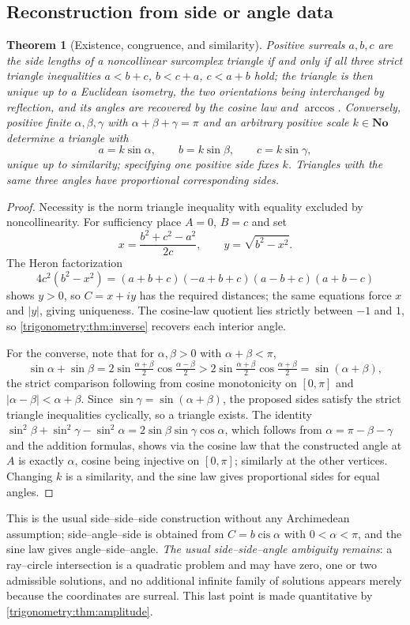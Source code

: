 \documentclass[11pt,letterpaper]{article}
\numberwithin{equation}{section}
\newtheorem{theorem}{Theorem}[section]
\theoremstyle{definition}
\theoremstyle{remark}
\newcommand{\No}{\mathbf{No}}
\newcommand{\cis}{\operatorname{cis}}
\begin{document}
\subsection{Reconstruction from side or angle data}
\begin{theorem}[Existence, congruence, and similarity]\label{trigonometry:thm:sss}
Positive surreals $a,b,c$ are the side lengths of a noncollinear surcomplex triangle if and only if
all three strict triangle inequalities $a<b+c$, $b<c+a$, $c<a+b$ hold; the triangle is then unique
up to a Euclidean isometry, the two orientations being interchanged by reflection, and its angles
are recovered by the cosine law and $\arccos$. Conversely, positive finite $\alpha,\beta,\gamma$
with $\alpha+\beta+\gamma=\pi$ and an arbitrary positive scale $k\in\No$ determine a triangle with
\[
 a=k\sin\alpha,\qquad b=k\sin\beta,\qquad c=k\sin\gamma,
\]
unique up to similarity; specifying one positive side fixes $k$. Triangles with the same three
angles have proportional corresponding sides.
\end{theorem}
\begin{proof}
Necessity is the norm triangle inequality with equality excluded by noncollinearity. For
sufficiency place $A=0$, $B=c$ and set
\[
 x=\frac{b^2+c^2-a^2}{2c},\qquad y=\sqrt{b^2-x^2} .
\]
The Heron factorization
\begin{equation}\label{trigonometry:eq:heronfactor}
 4c^2(b^2-x^2)=(a+b+c)(-a+b+c)(a-b+c)(a+b-c)
\end{equation}
shows $y>0$, so $C=x+iy$ has the required distances; the same equations force $x$ and $|y|$, giving
uniqueness. The cosine-law quotient lies strictly between $-1$ and $1$, so
\cref{trigonometry:thm:inverse} recovers each interior angle.

For the converse, note that for $\alpha,\beta>0$ with $\alpha+\beta<\pi$,
\[
 \sin\alpha+\sin\beta=2\sin\tfrac{\alpha+\beta}2\cos\tfrac{\alpha-\beta}2
 >2\sin\tfrac{\alpha+\beta}2\cos\tfrac{\alpha+\beta}2=\sin(\alpha+\beta),
\]
the strict comparison following from cosine monotonicity on $[0,\pi]$ and
$|\alpha-\beta|<\alpha+\beta$. Since $\sin\gamma=\sin(\alpha+\beta)$, the proposed sides satisfy
the strict triangle inequalities cyclically, so a triangle exists. The identity
$\sin^2\beta+\sin^2\gamma-\sin^2\alpha=2\sin\beta\sin\gamma\cos\alpha$, which follows from
$\alpha=\pi-\beta-\gamma$ and the addition formulas, shows via the cosine law that the constructed
angle at $A$ is exactly $\alpha$, cosine being injective on $[0,\pi]$; similarly at the other
vertices. Changing $k$ is a similarity, and the sine law gives proportional sides for equal angles.
\end{proof}
This is the usual side--side--side construction without any Archimedean assumption;
side--angle--side is obtained from $C=b\cis\alpha$ with $0<\alpha<\pi$, and the sine law gives
angle--side--angle. \emph{The usual side--side--angle ambiguity remains}: a ray--circle
intersection is a quadratic problem and may have zero, one or two admissible solutions, and no
additional infinite family of solutions appears merely because the coordinates are surreal. This
last point is made quantitative by \cref{trigonometry:thm:amplitude}.
\end{document}

